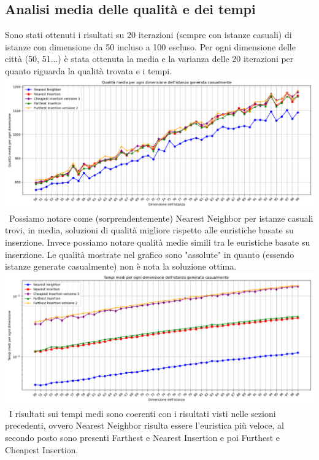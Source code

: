 \documentclass[a4paper,12pt]{report}
\begin{document}
\subsection{Analisi media delle qualità e dei tempi}
Sono stati ottenuti i risultati su 20 iterazioni (sempre con istanze casuali) di istanze con dimensione da 50 incluso a 100 escluso. Per ogni dimensione delle città (50, 51...) è stata ottenuta la media e la varianza delle 20 iterazioni per quanto riguarda la qualità trovata e i tempi. \newline
\includegraphics[width=1\textwidth]{../Grafici/20.png} \
Possiamo notare come (sorprendentemente) Nearest Neighbor per istanze casuali trovi, in media, soluzioni di qualità migliore rispetto alle euristiche basate su inserzione. Invece possiamo notare qualità medie simili tra le euristiche basate su inserzione. Le qualità mostrate nel grafico sono "assolute" in quanto (essendo istanze generate casualmente) non è nota la soluzione ottima. \newline
\includegraphics[width=1\textwidth]{../Grafici/21.png} \
I risultati sui tempi medi sono coerenti con i risultati visti nelle sezioni precedenti, ovvero Nearest Neighbor risulta essere l'euristica più veloce, al secondo posto sono presenti Farthest e Nearest Insertion e poi Furthest e Cheapest Insertion.
\end{document}
